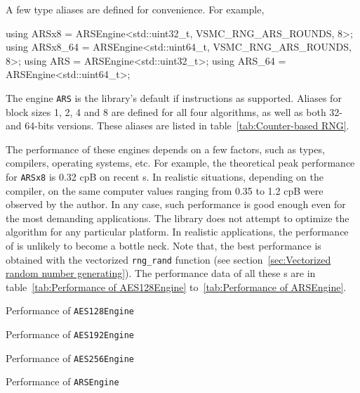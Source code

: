 A few type aliases are defined for convenience. For example,
\begin{cppcode}
  using ARSx8    = ARSEngine<std::uint32_t, VSMC_RNG_ARS_ROUNDS, 8>;
  using ARSx8_64 = ARSEngine<std::uint64_t, VSMC_RNG_ARS_ROUNDS, 8>;
  using ARS      = ARSEngine<std::uint32_t>;
  using ARS_64   = ARSEngine<std::uint64_t>;
\end{cppcode}
The engine \verb|ARS| is the library's default \rng if \aesni instructions as
supported. Aliases for block sizes 1, 2, 4 and 8 are defined for all four
algorithms, as well as both 32- and 64-bits versions. These aliases are listed
in table~\ref{tab:Counter-based RNG}.

The performance of these engines depends on a few factors, such as \cpu types,
compilers, operating systems, etc. For example, the theoretical peak
performance for \verb|ARSx8| is 0.32 cpB on recent \cpu{}s. In realistic
situations, depending on the compiler, on the same computer values ranging from
0.35 to 1.2 cpB were observed by the author. In any case, such performance is
good enough even for the most demanding applications. The library does not
attempt to optimize the algorithm for any particular platform. In realistic
applications, the performance of \rng is unlikely to become a bottle neck. Note
that, the best performance is obtained with the vectorized \verb|rng_rand|
function (see section~\ref{sec:Vectorized random number generating}). The
performance data of all these \rng{}s are in table~\ref{tab:Performance of
  AES128Engine} to~\ref{tab:Performance of ARSEngine}.

\begin{table}
  
  \caption{Performance of \texttt{AES128Engine}}
  \label{tab:Performance of AES128Engine}
\end{table}

\begin{table}
  
  \caption{Performance of \texttt{AES192Engine}}
  \label{tab:Performance of AES192Engine}
\end{table}

\begin{table}
  
  \caption{Performance of \texttt{AES256Engine}}
  \label{tab:Performance of AES256Engine}
\end{table}

\begin{table}
  
  \caption{Performance of \texttt{ARSEngine}}
  \label{tab:Performance of ARSEngine}
\end{table}

